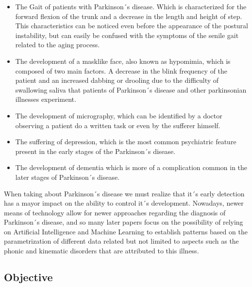 \documentclass[12pt, a4paper]{article}
\begin{document}
	\begin{itemize}
		
		\item The Gait of patients with Parkinson´s disease. Which is characterized for the forward flexion of the trunk and a decrease in the length and height of step. This characteristics can be noticed even before the appearance of the postural instability, but can easily be confused with the symptoms of the senile gait related to the aging process.
		
		\item The development of a masklike face, also known as hypomimia, which is composed of two main factors. A decrease in the blink frequency of the patient and an increased dabbing or drooling due to the difficulty of swallowing saliva that patients of Parkinson´s disease and other parkinsonian illnesses experiment.
		
		\item The development of micrography, which can be identified by a doctor observing a patient do a written task or even by the sufferer himself.
		
		\item The suffering of depression, which is the most common psychiatric feature present in the early stages of the Parkinson´s disease.
		
		\item The development of dementia which is more of a complication common in  the later stages of Parkinson´s disease.
		
	\end{itemize}
		
	When taking about Parkinson´s disease we must realize that it´s early detection has a mayor impact on the ability to control it´s development. Nowadays, newer means of technology allow for newer approaches regarding the diagnosis of Parkinson´s disease, and so many later papers focus on the possibility of relying on Artificial Intelligence and Machine Learning to establish patterns based on the parametrization of different data related but not limited to aspects such as the phonic and kinematic disorders that are attributed to this illness. 
	
	
	
	

	\clearpage
		
	\subsection{Objective}
	
\end{document}
